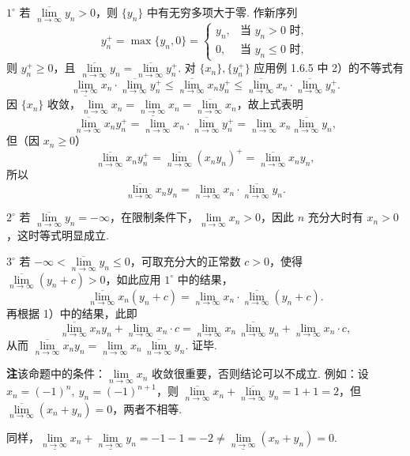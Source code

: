 \documentclass[UTF8,12pt,a4paper,fontset=fandol]{ctexart}
\begin{document}
$1^\circ$ 若 $\overline{\lim\limits_{n\to\infty}}y_n>0$，则 $\{y_n\}$ 中有无穷多项大于零. 作新序列
\[
  y_n^+=\max\{y_n,0\}=
  \begin{cases}
    y_n, & \text{当 }y_n>0\text{ 时},\\
    0, & \text{当 }y_n\le0\text{ 时},
  \end{cases}
\]
则 $y_n^+\ge0$，且 $\overline{\lim\limits_{n\to\infty}}y_n=\overline{\lim\limits_{n\to\infty}}y_n^+$. 对 $\{x_n\},\{y_n^+\}$ 应用例 1.6.5 中 2）的不等式有
\[
  \underline{\lim_{n\to\infty}}x_n\cdot\overline{\lim_{n\to\infty}}y_n^+
  \le \overline{\lim_{n\to\infty}}x_ny_n^+
  \le \overline{\lim_{n\to\infty}}x_n\cdot\overline{\lim_{n\to\infty}}y_n^+.
\]
因 $\{x_n\}$ 收敛，$\lim\limits_{n\to\infty}x_n=\underline{\lim\limits_{n\to\infty}}x_n=\overline{\lim\limits_{n\to\infty}}x_n$，故上式表明
\[
  \overline{\lim_{n\to\infty}}x_ny_n^+
  =\lim_{n\to\infty}x_n\cdot\overline{\lim_{n\to\infty}}y_n^+
  =\lim_{n\to\infty}x_n\overline{\lim_{n\to\infty}}y_n,
\]
但（因 $x_n\ge0$）
\[
  \overline{\lim_{n\to\infty}}x_ny_n^+
  =\overline{\lim_{n\to\infty}}(x_ny_n)^+
  =\overline{\lim_{n\to\infty}}x_ny_n,
\]
所以
\[
  \overline{\lim_{n\to\infty}}x_ny_n
  =\lim_{n\to\infty}x_n\cdot\overline{\lim_{n\to\infty}}y_n.
\]

$2^\circ$ 若 $\overline{\lim\limits_{n\to\infty}}y_n=-\infty$，在限制条件下，$\lim\limits_{n\to\infty}x_n>0$，因此 $n$ 充分大时有 $x_n>0$，这时等式明显成立.

$3^\circ$ 若 $-\infty<\overline{\lim\limits_{n\to\infty}}y_n\le0$，可取充分大的正常数 $c>0$，使得 $\overline{\lim\limits_{n\to\infty}}(y_n+c)>0$，如此应用 $1^\circ$ 中的结果，
\[
  \overline{\lim_{n\to\infty}}x_n(y_n+c)
  =\lim_{n\to\infty}x_n\cdot\overline{\lim_{n\to\infty}}(y_n+c).
\]
再根据 1）中的结果，此即
\[
  \overline{\lim_{n\to\infty}}x_ny_n+\lim_{n\to\infty}x_n\cdot c
  =\lim_{n\to\infty}x_n\,\overline{\lim_{n\to\infty}}y_n+\lim_{n\to\infty}x_n\cdot c,
\]
从而 $\overline{\lim\limits_{n\to\infty}}x_ny_n
=\lim\limits_{n\to\infty}x_n\,\overline{\lim\limits_{n\to\infty}}y_n$. 证毕.

\noindent\textbf{注}\quad 该命题中的条件：$\lim\limits_{n\to\infty}x_n$ 收敛很重要，否则结论可以不成立. 例如：设 $x_n=(-1)^n,\ y_n=(-1)^{n+1}$，则 $\overline{\lim\limits_{n\to\infty}}x_n+\overline{\lim\limits_{n\to\infty}}y_n=1+1=2$，但 $\overline{\lim\limits_{n\to\infty}}(x_n+y_n)=0$，两者不相等.

同样，$\underline{\lim\limits_{n\to\infty}}x_n+\underline{\lim\limits_{n\to\infty}}y_n=-1-1=-2\ne \underline{\lim\limits_{n\to\infty}}(x_n+y_n)=0$.
\end{document}
